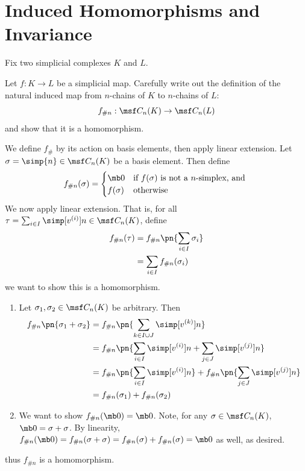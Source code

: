 \section{Induced Homomorphisms and Invariance}
Fix two simplicial complexes $K$ and $L$.
\begin{problem}[16.14]
  Let $f : K \to L$ be a simplicial map. Carefully write out the definition of
  the natural induced map from $n$-chains of $K$ to $n$-chains of $L$:
  \[
    f_{\# n} : \msf C_n(K) \to \msf C_n(L)
  \]
  and show that it is a homomorphism.
\end{problem}
\begin{solution}
  We define $f_\#$ by its action on basis elements, then apply linear extension.
  Let $\sigma = \simp{n} \in \msf C_n(K)$ be a basis element. Then define
  \[
    f_{\# n}(\sigma) =
    \begin{cases}
      \mb 0 & \text{if $f(\sigma)$ is not a $n$-simplex, and }\\
      f(\sigma) & \text{otherwise}
    \end{cases}
  \]
  We now apply linear extension. That is, for all $\tau = \sum_{i \in I}
  \simp[v^{(i)}]{n} \in \msf C_n(K)$, define
  \begin{align*}
    f_{\# n}(\tau)
    &= f_{\# n} \pn{\sum_{i\in I} \sigma_i} \\
    &= \sum_{i\in I} f_{\# n}(\sigma_i)
  \end{align*}
  we want to show this is a homomorphism.
  \begin{enumerate}[label=(\arabic*)]
  \item Let $\sigma_1, \sigma_2 \in \msf C_n(K)$ be arbitrary. Then
    \begin{align*}
      f_{\# n}\pn{\sigma_1 + \sigma_2}
      &= f_{\# n} \pn{\sum_{k\in I \cup J} \simp[v^{(k)}]{n}} \\
      &= f_{\# n} \pn{\sum_{i\in I} \simp[v^{(i)}]{n} + \sum_{j \in J} \simp[v^{(j)}]{n}} \\
      &= f_{\# n} \pn{\sum_{i\in I} \simp[v^{(i)}]{n}} + f_{\# n}\pn{\sum_{j \in J} \simp[v^{(j)}]{n}} \\
      &= f_{\# n}(\sigma_1) + f_{\# n}(\sigma_2)
    \end{align*}
  \item We want to show $f_{\# n}(\mb 0) = \mb 0$. Note, for any $\sigma \in
    \msf C_n(K)$, $\mb 0 = \sigma + \sigma$. By linearity, $f_{\# n}(\mb 0) =
    f_{\# n}(\sigma + \sigma) = f_{\# n}(\sigma) + f_{\# n}(\sigma) = \mb 0$
    as well, as desired.
  \end{enumerate}
  thus $f_{\# n}$ is a homomorphism.
\end{solution}
